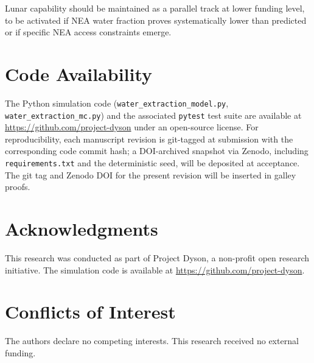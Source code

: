 \documentclass[preprint,12pt]{elsarticle}
\begin{document}
Lunar capability should be maintained as a parallel track at lower funding level, to be activated if NEA water fraction proves systematically lower than predicted or if specific NEA access constraints emerge.

\section*{Code Availability}

The Python simulation code (\texttt{water\_extraction\_model.py}, \texttt{water\_extraction\_mc.py}) and the associated \texttt{pytest} test suite are available at \url{https://github.com/project-dyson} under an open-source license. For reproducibility, each manuscript revision is git-tagged at submission with the corresponding code commit hash; a DOI-archived snapshot via Zenodo, including \texttt{requirements.txt} and the deterministic seed, will be deposited at acceptance. The git tag and Zenodo DOI for the present revision will be inserted in galley proofs.

\section*{Acknowledgments}

This research was conducted as part of Project Dyson, a non-profit open research initiative. The simulation code is available at \url{https://github.com/project-dyson}.

\section*{Conflicts of Interest}

The authors declare no competing interests. This research received no external funding.

\end{document}
